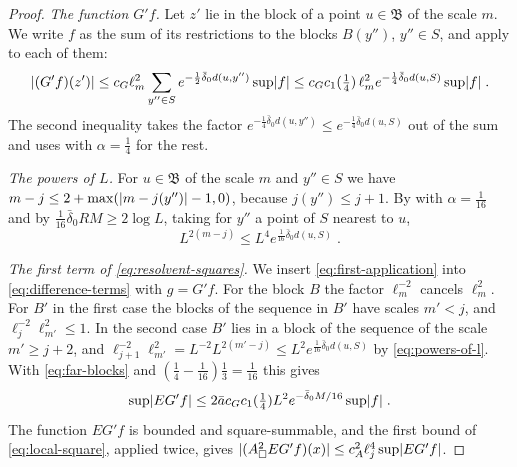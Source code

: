 \documentclass[11pt]{preprint}
\DeclarePairedDelimiter{\abs}{\lvert}{\rvert}
\numberwithin{equation}{section}
\theoremstyle{definition}
\theoremstyle{remark}
\theoremstyle{plain}
\begin{document}
\begin{proof}
\emph{The function $G'f$.} Let $z'$ lie in the block of a point $u \in \mathfrak B$ of the scale $m$. We write $f$ as the sum of its restrictions to the blocks $B(y'')$, $y'' \in S$, and apply \cite[(2.67)]{BalabanPRT2} to each of them:
\begin{equation}\label{eq:first-application}
    \abs{(G'f)(z')} \leq c_G\ell_m^2\sum_{y'' \in S}e^{-\frac12\bar\delta_0d(u, y'')}\sup\abs f \leq c_Gc_1(\tfrac14)\,\ell_m^2e^{-\frac14\bar\delta_0d(u, S)}\sup\abs f\;.
\end{equation}
The second inequality takes the factor $e^{-\frac14\bar\delta_0d(u, y'')} \leq e^{-\frac14\bar\delta_0d(u, S)}$ out of the sum and uses \cite[(2.61)]{BalabanPRT2} with $\alpha = \frac14$ for the rest.

\emph{The powers of $L$.} For $u \in \mathfrak B$ of the scale $m$ and $y'' \in S$ we have $m - j \leq 2 + \max(\abs{m - j(y'')} - 1, 0)$, because $j(y'') \leq j + 1$. By \cite[(2.60)]{BalabanPRT2} with $\alpha = \frac{1}{16}$ and by $\frac{1}{16}\bar\delta_0RM \geq 2\log L$, taking for $y''$ a point of $S$ nearest to $u$,
\begin{equation}\label{eq:powers-of-l}
    L^{2(m - j)} \leq L^4e^{\frac{1}{16}\bar\delta_0d(u, S)}\;.
\end{equation}

\emph{The first term of \eqref{eq:resolvent-squares}.} We insert \eqref{eq:first-application} into \eqref{eq:difference-terms} with $g = G'f$. For the block $B$ the factor $\ell_m^{-2}$ cancels $\ell_m^2$. For $B'$ in the first case the blocks of the sequence in $B'$ have scales $m' < j$, and $\ell_j^{-2}\ell_{m'}^2 \leq 1$. In the second case $B'$ lies in a block of the sequence of the scale $m' \geq j + 2$, and $\ell_{j+1}^{-2}\ell_{m'}^2 = L^{-2}L^{2(m' - j)} \leq L^2e^{\frac{1}{16}\bar\delta_0d(u, S)}$ by \eqref{eq:powers-of-l}. With \eqref{eq:far-blocks} and $(\frac14 - \frac{1}{16})\frac13 = \frac{1}{16}$ this gives
\begin{equation}\label{eq:first-term}
    \sup\abs{EG'f} \leq 2\bar ac_Gc_1(\tfrac14)L^2e^{-\bar\delta_0M/16}\sup\abs f\;.
\end{equation}
The function $EG'f$ is bounded and square-summable, and the first bound of \eqref{eq:local-square}, applied twice, gives $\abs{(A_\square^2EG'f)(x)} \leq c_A^2\ell_j^4\sup\abs{EG'f}$.


\end{proof}
\end{document}

